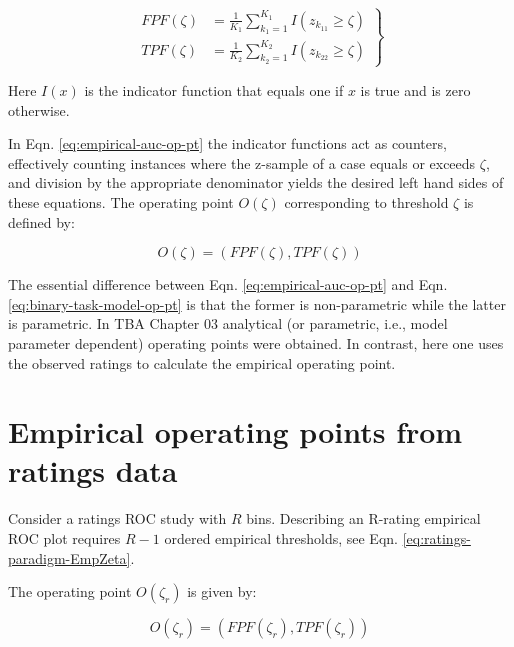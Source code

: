 \documentclass[
]{book}
\begin{document}
\begin{equation}
\left.
\begin{aligned}
FPF\left ( \zeta \right ) &= \frac{1}{K_1}\sum_{k_1=1}^{K_1}I\left ( z_{k_11} \geq \zeta \right ) \\
TPF\left ( \zeta \right ) &= \frac{1}{K_2}\sum_{k_2=1}^{K_2}I\left ( z_{k_22} \geq \zeta \right )
\end{aligned}
\right \}
\label{eq:empirical-auc-op-pt}
\end{equation}

Here \(I(x)\) is the indicator function that equals one if \(x\) is true and is zero otherwise.

In Eqn. \eqref{eq:empirical-auc-op-pt} the indicator functions act as counters, effectively counting instances where the z-sample of a case equals or exceeds \(\zeta\), and division by the appropriate denominator yields the desired left hand sides of these equations. The operating point \(O(\zeta)\) corresponding to threshold \(\zeta\) is defined by:

\begin{equation}
O\left ( \zeta \right ) = \left ( FPF\left ( \zeta \right ), TPF\left ( \zeta \right ) \right )
\label{eq:empirical-OperatingPoint}
\end{equation}

The essential difference between Eqn. \eqref{eq:empirical-auc-op-pt} and Eqn. \eqref{eq:binary-task-model-op-pt} is that the former is non-parametric while the latter is parametric. In TBA Chapter 03 analytical (or parametric, i.e., model parameter dependent) operating points were obtained. In contrast, here one uses the observed ratings to calculate the empirical operating point.

\hypertarget{empirical-auc-operating-points}{%
\section{Empirical operating points from ratings data}\label{empirical-auc-operating-points}}

Consider a ratings ROC study with \(R\) bins. Describing an R-rating empirical ROC plot requires \(R-1\) ordered empirical thresholds, see Eqn. \eqref{eq:ratings-paradigm-EmpZeta}.

The operating point \(O(\zeta_r)\) is given by:

\begin{equation}
O\left ( \zeta_r \right ) = \left ( FPF\left ( \zeta_r \right ), TPF\left ( \zeta_r \right ) \right )
\label{eq:empirical-OperatingPointZetar}
\end{equation}
\end{document}
